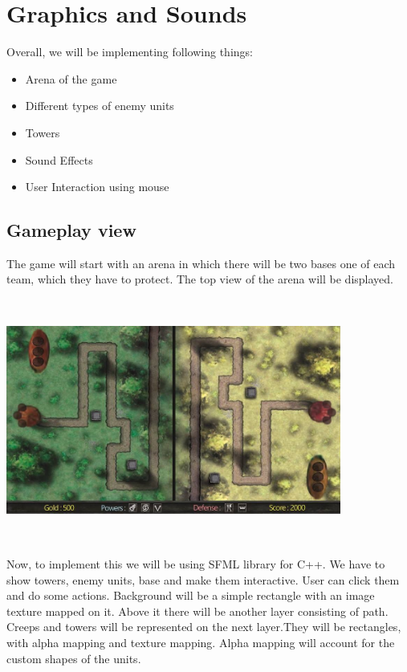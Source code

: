 \documentclass{article}
\begin{document}
\newpage
\section{Graphics and Sounds}
Overall, we will be implementing following things:
\begin{itemize}
\item Arena of the game
\item Different types of enemy units
\item Towers
\item Sound Effects
\item User Interaction using mouse
\end{itemize}
\subsection{Gameplay view}
The game will start with an arena in which there will be two bases one of each team, which they have to protect. The top view of the arena will be displayed.\\
\begin{center}
\includegraphics[width=11cm, height=8cm]{arena.png}
\end{center}
Now, to implement this we will be using SFML library for C++. We have to show towers, enemy units, base and make them interactive. User can click them and do some actions. Background will be a simple rectangle with an image texture mapped on it. Above it there will be another layer consisting of path.\\
Creeps and towers will be represented on the next layer.They will be rectangles, with alpha mapping and texture mapping. Alpha mapping will account for the custom shapes of the units.\\
\end{document}
